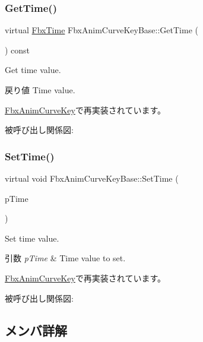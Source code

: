\subsubsection{\texorpdfstring{Get\+Time()}{GetTime()}}
{\footnotesize\ttfamily virtual \hyperlink{class_fbx_time}{Fbx\+Time} Fbx\+Anim\+Curve\+Key\+Base\+::\+Get\+Time (\begin{DoxyParamCaption}{ }\end{DoxyParamCaption}) const\hspace{0.3cm}{\ttfamily [virtual]}}

Get time value. \begin{DoxyReturn}{戻り値}
Time value. 
\end{DoxyReturn}


\hyperlink{class_fbx_anim_curve_key_aae0882b53b31502cb30ea35de028837f}{Fbx\+Anim\+Curve\+Key}で再実装されています。

被呼び出し関係図\+:
\mbox{\label{class_fbx_anim_curve_key_base_a1c8d15159d7b00280411c08f86c951ca}} 
\subsubsection{\texorpdfstring{Set\+Time()}{SetTime()}}
{\footnotesize\ttfamily virtual void Fbx\+Anim\+Curve\+Key\+Base\+::\+Set\+Time (\begin{DoxyParamCaption}\item[{const \hyperlink{class_fbx_time}{Fbx\+Time} \&}]{p\+Time }\end{DoxyParamCaption})\hspace{0.3cm}{\ttfamily [virtual]}}

Set time value. 
\begin{DoxyParams}{引数}
{\em p\+Time} & Time value to set. \\
\hline
\end{DoxyParams}


\hyperlink{class_fbx_anim_curve_key_a6ebc96b8346a345534c0eb2e1b6d9291}{Fbx\+Anim\+Curve\+Key}で再実装されています。

被呼び出し関係図\+:


\subsection{メンバ詳解}
\mbox{\label{class_fbx_anim_curve_key_base_a8b62f6694176ae418ed4cb936f52545a}} 
